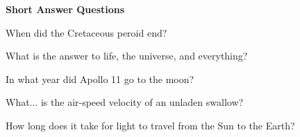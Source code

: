 \documentclass[10pt,answers,addpoints]{exam}
\begin{document}
\begin{questions}



\newpage
\begin{center}
{\Large \textbf{Short Answer Questions}}
\end{center}

\par\vspace{0.100000in}\begin{minipage}{\linewidth}
\vspace{.35cm}\question[2]
When did the Cretaceous peroid end?
\vspace{.25cm}\setlength\answerlinelength{3in}
\end{minipage}


\par\vspace{0.100000in}\begin{minipage}{\linewidth}
\vspace{.35cm}\question[2]
What is the answer to life, the universe, and everything?
\vspace{.25cm}\setlength\answerlinelength{3in}
\answerline[42]
\end{minipage}


\par\vspace{0.100000in}\begin{minipage}{\linewidth}
\vspace{.35cm}\question[2]
In what year did Apollo 11 go to the moon?
\vspace{.25cm}\setlength\answerlinelength{3in}
\answerline[1969]
\end{minipage}


\par\vspace{0.100000in}\begin{minipage}{\linewidth}
\vspace{.35cm}\question[2]
What... is the air-speed velocity of an unladen swallow?
\vspace{.25cm}\setlength\answerlinelength{3in}
\end{minipage}


\par\vspace{0.100000in}\begin{minipage}{\linewidth}
\vspace{.35cm}\question[2]
How long does it take for light to travel from the Sun to the Earth?
\vspace{.25cm}\setlength\answerlinelength{3in}
\answerline[8 minutes]
\end{minipage}



\end{questions}
\end{document}
